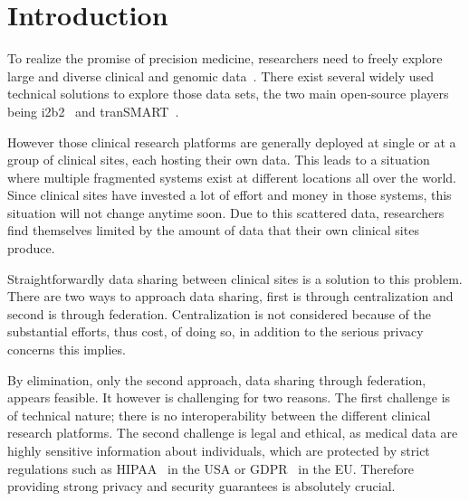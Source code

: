 


\chapter{Introduction}

To realize the promise of precision medicine, researchers need to freely explore large and diverse clinical and genomic data~\cite{scollen2017data}.
There exist several widely used technical solutions to explore those data sets, the two main open-source players being i2b2~\cite{murphy2010serving} and tranSMART~\cite{scheufele2014transmart}.

However those clinical research platforms are generally deployed at single or at a group of clinical sites, each hosting their own data.
This leads to a situation where multiple fragmented systems exist at different locations all over the world. Since clinical sites have invested a lot of effort and money in those systems, this situation will not change anytime soon.
Due to this scattered data, researchers find themselves limited by the amount of data that their own clinical sites produce.

Straightforwardly data sharing between clinical sites is a solution to this problem.
There are two ways to approach data sharing, first is through centralization and second is through federation.
Centralization is not considered because of the substantial efforts, thus cost, of doing so, in addition to the serious privacy concerns this implies.

By elimination, only the second approach, data sharing through federation, appears feasible.
It however is challenging for two reasons.
The first challenge is of technical nature; there is no interoperability between the different clinical research platforms.
The second challenge is legal and ethical, as medical data are highly sensitive information about individuals, which are protected by strict regulations such as HIPAA~\cite{centers2003hipaa} in the USA or GDPR~\cite{gdpr} in the EU.
Therefore providing strong privacy and security guarantees is absolutely crucial.

